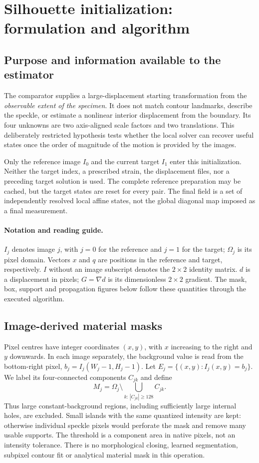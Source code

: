 \section{Silhouette initialization: formulation and algorithm}
\label{sec:silhouette}
\subsection{Purpose and information available to the estimator}
The comparator supplies a large-displacement starting transformation from the
\emph{observable extent of the specimen}. It does not match contour landmarks,
describe the speckle, or estimate a nonlinear interior displacement from the
boundary. Its four unknowns are two axis-aligned scale factors and two
translations. This deliberately restricted hypothesis tests whether the local
solver can recover useful states once the order of magnitude of the motion is
provided by the images.

Only the reference image $I_0$ and the current target $I_1$ enter this
initialization. Neither the target index, a prescribed strain, the displacement
files, nor a preceding target solution is used. The complete reference
preparation may be cached, but the target states are reset for every pair.
The final field is a set of independently resolved local affine states, not
the global diagonal map imposed as a final measurement.

\paragraph{Notation and reading guide.}
$I_j$ denotes image $j$, with $j=0$ for the reference and $j=1$ for the target;
$\Omega_j$ is its pixel domain. Vectors $x$ and $q$ are positions in the reference
and target, respectively. $I$ without an image subscript denotes the $2\times2$
identity matrix. $d$ is a displacement in pixels; $G=\nabla d$ is its dimensionless
$2\times2$ gradient. The mask, box, support and propagation figures below follow
these quantities through the executed algorithm.

\subsection{Image-derived material masks}
Pixel centres have integer coordinates $(x,y)$, with $x$ increasing to the right
and $y$ downwards. In each image separately, the background value is read from
the bottom-right pixel, $b_j=I_j(W_j-1,H_j-1)$. Let
$E_j=\{(x,y):I_j(x,y)=b_j\}$. We label its four-connected components
$C_{jk}$ and define
\begin{equation}
 M_j=\Omega_j\setminus\bigcup_{k:\,|C_{jk}|\ge128}C_{jk}.
 \label{eq:silhouette-mask}
\end{equation}
Thus large constant-background regions, including sufficiently large internal
holes, are excluded. Small islands with the same quantized intensity are kept:
otherwise individual speckle pixels would perforate the mask and remove many
usable supports. The threshold is a component area in native pixels, not an
intensity tolerance. There is no morphological closing, learned segmentation,
subpixel contour fit or analytical material mask in this operation.

